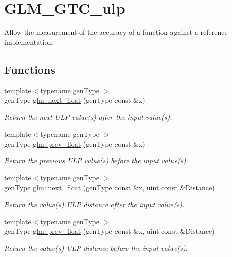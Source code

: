 \hypertarget{group__gtc__ulp}{\section{G\-L\-M\-\_\-\-G\-T\-C\-\_\-ulp}
\label{group__gtc__ulp}
}


Allow the measurement of the accuracy of a function against a reference implementation.  


\subsection*{Functions}
\begin{DoxyCompactItemize}
\item 
{\footnotesize template$<$typename gen\-Type $>$ }\\gen\-Type \hyperlink{group__gtc__ulp_ga3be6de2d954fb457ff88085128e4b521}{glm\-::next\-\_\-float} (gen\-Type const \&x)
\begin{DoxyCompactList}\small\item\em Return the next U\-L\-P value(s) after the input value(s). \end{DoxyCompactList}\item 
{\footnotesize template$<$typename gen\-Type $>$ }\\gen\-Type \hyperlink{group__gtc__ulp_ga2a0122b31c643ca1546635fe8e4f9f74}{glm\-::prev\-\_\-float} (gen\-Type const \&x)
\begin{DoxyCompactList}\small\item\em Return the previous U\-L\-P value(s) before the input value(s). \end{DoxyCompactList}\item 
{\footnotesize template$<$typename gen\-Type $>$ }\\gen\-Type \hyperlink{group__gtc__ulp_ga27752f3f7a9a79a50e95a9ed42800ca7}{glm\-::next\-\_\-float} (gen\-Type const \&x, uint const \&Distance)
\begin{DoxyCompactList}\small\item\em Return the value(s) U\-L\-P distance after the input value(s). \end{DoxyCompactList}\item 
{\footnotesize template$<$typename gen\-Type $>$ }\\gen\-Type \hyperlink{group__gtc__ulp_gae506d2fb08aff01e00763d7ed76fe117}{glm\-::prev\-\_\-float} (gen\-Type const \&x, uint const \&Distance)
\begin{DoxyCompactList}\small\item\em Return the value(s) U\-L\-P distance before the input value(s). \end{DoxyCompactList}\item 

\end{DoxyCompactItemize}
